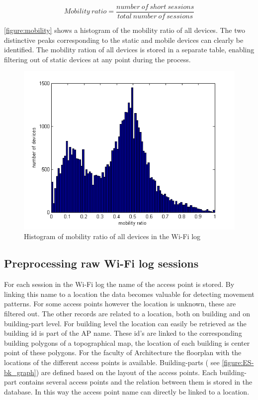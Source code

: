 \[
    Mobility\ ratio = \frac{number\ of\ short\ sessions}{total\ number\ of\ sessions}
\] 

\autoref{figure:mobility} shows a histogram of the mobility ratio of all devices. The two distinctive peaks corresponding to the static and mobile devices can clearly be identified. The mobility ration of all devices is stored in a separate table, enabling filtering out of static devices at any point during the process.

\begin{figure}[H]
\centering
\includegraphics[scale=0.4]{mobility.png}
\captionsetup{justification=centering}
\caption{Histogram of mobility ratio of all devices in the Wi-Fi log}
\label{figure:ES-mobility}
\end{figure}

\subsection{Preprocessing raw Wi-Fi log sessions}\label{ES-preprocessing}
For each session in the Wi-Fi log the name of the access point is stored. By linking this name to a location the data becomes valuable for detecting movement patterns. For some access points however the location is unknown, these are filtered out. The other records are related to a location, both on building and on building-part level. For building level the location can easily be retrieved as the building id is part of the AP name. These id's are linked to the corresponding building polygons of a topographical map, the location of each building is center point of these polygons. For the faculty of Architecture the floorplan with the locations of the different access points is available. Building-parts ( see \autoref{figure:ES-bk_graph}) are defined based on the layout of the access points. Each building-part contains several access points and the relation between them is stored in the database. In this way the access point name can directly be linked to a location.  

